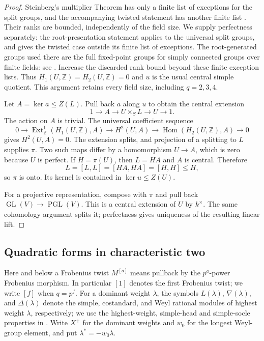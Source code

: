\begin{proof}
Steinberg's multiplier Theorem has only a finite list of exceptions
for the split groups, and the accompanying twisted statement has
another finite list
\cite[Theorem~1.1 and the opening paragraph of p.~528]{Steinberg1981}.
Their ranks are bounded, independently of the field size.  We supply
perfectness separately: the root-presentation statement
\cite[Lemma~$32'$, original pp.~51--53]{SteinbergNotes} applies to the
universal split groups, and
\cite[Theorem~34 and its proof, original pp.~187--188]{SteinbergNotes}
gives the twisted case outside its finite list of exceptions.
The root-generated groups used there are the full fixed-point groups
for simply connected groups over finite fields: see
\cite[Corollary~3 to Theorem~7, original p.~65, and the Corollary
after Lemma~64, original p.~186]{SteinbergNotes}.
Increase the discarded rank bound beyond these finite exception lists.
Thus $H_1(U,\mathbb Z)=H_2(U,\mathbb Z)=0$ and $u$ is the usual
central simple quotient.  This argument retains every field size,
including $q=2,3,4$.

Let $A=\ker a\leq Z(L)$.  Pull back $a$ along $u$ to obtain the
central extension
\[
 1\longrightarrow A\longrightarrow U\times_S L
       \longrightarrow U\longrightarrow1.
\]
The action on $A$ is trivial.  The universal coefficient sequence
\[
 0\longrightarrow
 \operatorname{Ext}^1_{\mathbb Z}(H_1(U,\mathbb Z),A)
 \longrightarrow H^2(U,A)
 \longrightarrow\operatorname{Hom}(H_2(U,\mathbb Z),A)
 \longrightarrow0
\]
gives $H^2(U,A)=0$.  The extension splits, and projection of a
splitting to $L$ supplies $\pi$.  Two such maps differ by a
homomorphism $U\to A$, which is zero because $U$ is perfect.
If $H=\pi(U)$, then $L=HA$ and $A$ is central.  Therefore
\[
 L=[L,L]=[HA,HA]=[H,H]\leq H,
\]
so $\pi$ is onto.  Its kernel is contained in $\ker u\leq Z(U)$.

For a projective representation, compose with $\pi$ and pull back
$\operatorname{GL}(V)\to\operatorname{PGL}(V)$.  This is a central
extension of $U$ by $k^\times$.  The same cohomology argument splits
it; perfectness gives uniqueness of the resulting linear lift.
\end{proof}

\subsection{Quadratic forms in characteristic two}

Here and below a Frobenius twist $M^{[a]}$ means pullback by the $p^a$-power
Frobenius morphism.  In particular $[1]$ denotes the first Frobenius twist;
we write $[f]$ when $q=p^f$.  For a dominant weight $\lambda$, the symbols $L(\lambda)$,
$\nabla(\lambda)$, and $\Delta(\lambda)$ denote the simple,
costandard, and Weyl rational modules of highest weight $\lambda$,
respectively; we use the highest-weight, simple-head and simple-socle
properties in \cite[Part~II, Chapter~2]{Jantzen2003}.  Write $X^+$ for the dominant weights and $w_0$ for
the longest Weyl-group element, and put $\lambda^*=-w_0\lambda$.

